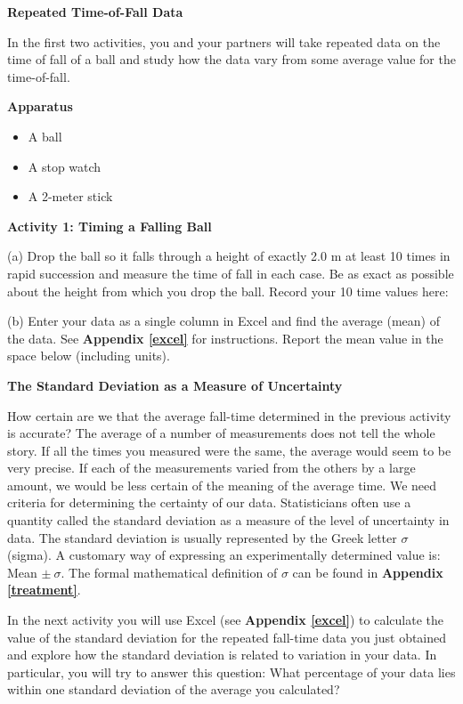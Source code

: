 \bigskip
\textbf{Repeated Time-of-Fall Data} 

In the first two activities, you and your partners will take repeated data on
the time of fall of a ball and study how the data vary from some average value
for the time-of-fall.

\textbf{Apparatus} 

\begin{itemize}[nosep]
\item A ball 
\item A stop watch 
\item A 2-meter stick
\end{itemize}

\bigskip
\textbf{Activity 1: Timing a Falling Ball} 

(a) Drop the ball so it falls through a height of exactly 2.0 m at least 10
times in rapid succession and measure the time of fall in each case. Be as exact as possible about the height from which you drop the ball. Record your 10 time values here:
\answerspace{40mm}

\pagebreak[2]
(b) Enter your data as a single column in Excel and find the 
average (mean) of the data.
See \textbf{Appendix \ref{excel}} for instructions. Report the
mean value in the space below (including units).
\vspace{10mm}

\textbf{The Standard Deviation as a Measure of Uncertainty }

How certain are we that the average fall-time determined in the previous activity
is accurate? The average of a number of measurements does not tell the whole
story. If all the times you measured were the same, the average would seem to
be very precise. If each of the measurements varied from the others by a large
amount, we would be less certain of the meaning of the average time. We need
criteria for determining the certainty of our data. Statisticians often use
a quantity called the standard deviation as a measure of the level of uncertainty
in data. The standard deviation is usually represented by the Greek letter \( \sigma  \)
(sigma). A customary way of expressing an experimentally determined value is:
Mean  \( \pm \ \sigma  \). The formal mathematical definition of \( \sigma  \)
can be found in \textbf{Appendix \ref{treatment}}.

In the next activity you will use Excel (see \textbf{Appendix \ref{excel}}) to calculate
the value of the standard deviation for the repeated fall-time data you just
obtained and explore how the standard deviation is related to variation in your
data. In particular, you will try to answer this question: What percentage of
your data lies within one standard deviation of the average you calculated?

